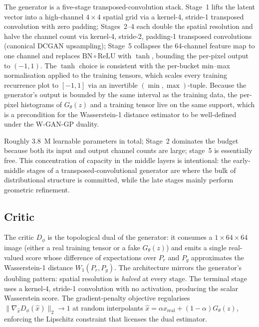 The generator is a five-stage transposed-convolution stack. Stage~1
lifts the latent vector into a high-channel $4 \times 4$ spatial grid
via a kernel-4, stride-1 transposed convolution with zero padding;
Stages~2--4 each double the spatial resolution and halve the channel
count via kernel-4, stride-2, padding-1 transposed convolutions
(canonical DCGAN upsampling); Stage~5 collapses the 64-channel
feature map to one channel and replaces $\mathrm{BN} \circ
\mathrm{ReLU}$ with $\tanh$, bounding the per-pixel output to
$(-1, 1)$. The $\tanh$ choice is consistent with the per-bucket
min--max normalisation applied to the training tensors, which scales
every training recurrence plot to $[-1, 1]$ via an invertible
$(\min, \max)$-tuple. Because the generator's output is bounded by the
same interval as the training data, the per-pixel histograms of
$G_\theta(z)$ and a training tensor live on the same support, which
is a precondition for the Wasserstein-1 distance estimator to be
well-defined under the W-GAN-GP duality.

Roughly $3.8$~M learnable parameters in total; Stage~2 dominates the
budget because both its input and output channel counts are large;
stage~5 is essentially free. This concentration of capacity in the
middle layers is intentional: the early-middle stages of a
transposed-convolutional generator are where the bulk of
distributional structure is committed, while the late stages mainly
perform geometric refinement.

\subsection*{Critic}
\begin{center}
\scalebox{0.75}{}
\end{center}

The critic $D_\phi$ is the topological dual of the generator: it
consumes a $1 \times 64 \times 64$ image (either a real training
tensor or a fake $G_\theta(z)$) and emits a single real-valued score
whose difference of expectations over $P_r$ and $P_g$ approximates the
Wasserstein-1 distance $W_1(P_r, P_g)$. The architecture mirrors the
generator's doubling pattern: spatial resolution is \emph{halved} at
every stage. The terminal stage uses a kernel-4, stride-1 convolution
with no activation, producing the scalar Wasserstein score. The
gradient-penalty objective regularises $\|\nabla_{\hat{x}}
D_\phi(\hat{x})\|_2 \to 1$ at random interpolants
$\hat{x} = \alpha x_{\text{real}} + (1-\alpha) G_\theta(z)$, enforcing
the Lipschitz constraint that licenses the dual estimator.

